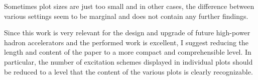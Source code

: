 \documentclass[aps
,prstab
,preprint,tightenlines
,amsfonts,amssymb,amsmath
]{revtex4-1}
\begin{document}
Sometimes plot sizes are just too small and in other cases, the 
difference between various settings seem to be marginal and does not 
contain any further findings. 

Since this work is very relevant for the design and upgrade of future 
high-power hadron accelerators and the performed work is excellent, I 
suggest reducing the length and content of the paper to a more compact 
and comprehensible level. In particular, the number of excitation 
schemes displayed in individual plots should be reduced to a level 
that the content of the various plots is clearly recognizable.
\end{document}
